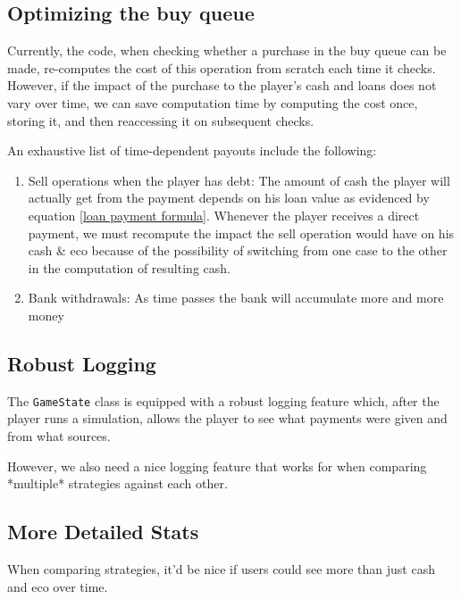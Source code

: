 \documentclass[12pt,letterpaper]{article}
\theoremstyle{remark}
\theoremstyle{plain}
\begin{document}
\subsection{Optimizing the buy queue}

Currently, the code, when checking whether a purchase in the buy queue can be made, re-computes the cost of this operation from scratch each time it checks. However, if the impact of the purchase to the player's cash and loans does not vary over time, we can save computation time by computing the cost once, storing it, and then reaccessing it on subsequent checks.

An exhaustive list of time-dependent payouts include the following:
\begin{enumerate}
    \item Sell operations when the player has debt: The amount of cash the player will actually get from the payment depends on his loan value as evidenced by equation \ref{loan payment formula}. Whenever the player receives a direct payment, we must recompute the impact the sell operation would have on his cash \& eco because of the possibility of switching from one case to the other in the computation of resulting cash.
    \item Bank withdrawals: As time passes the bank will accumulate more and more money
\end{enumerate}

\subsection{Robust Logging}

The \texttt{GameState} class is equipped with a robust logging feature which, after the player runs a simulation, allows the player to see what payments were given and from what sources.

However, we also need a nice logging feature that works for when comparing *multiple* strategies against each other.

\subsection{More Detailed Stats}

When comparing strategies, it'd be nice if users could see more than just cash and eco over time.
\end{document}
